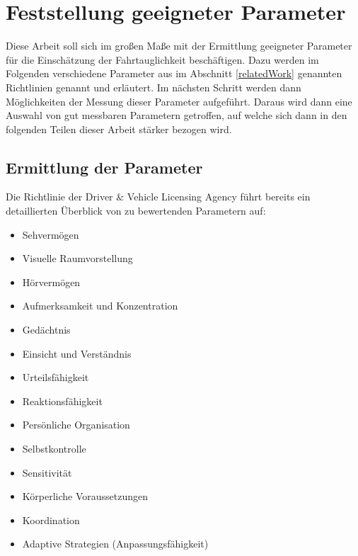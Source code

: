 \section{Feststellung geeigneter Parameter}
\label{parameters}

Diese Arbeit soll sich im großen Maße mit der Ermittlung geeigneter Parameter für die Einschätzung der Fahrtauglichkeit beschäftigen. Dazu werden im Folgenden verschiedene Parameter aus im Abschnitt \ref{relatedWork} genannten Richtlinien genannt und erläutert. Im nächsten Schritt werden dann Möglichkeiten der Messung dieser Parameter aufgeführt. Daraus wird dann eine Auswahl von gut messbaren Parametern getroffen, auf welche sich dann in den folgenden Teilen dieser Arbeit stärker bezogen wird.
\subsection{Ermittlung der Parameter}

Die Richtlinie der Driver \& Vehicle Licensing Agency \cite{drivervehiclelicencingagency} führt bereits ein detaillierten Überblick von zu bewertenden Parametern auf:

\begin{multicols}{2}
\begin{itemize}
	\item Sehvermögen
	\item Visuelle Raumvorstellung
	\item Hörvermögen
	\item Aufmerksamkeit und Konzentration
	\item Gedächtnis
	\item Einsicht und Verständnis
	\item Urteilsfähigkeit
	\item Reaktionsfähigkeit
	\item Persönliche Organisation
	\item Selbstkontrolle
	\item Sensitivität
	\item Körperliche Voraussetzungen
	\item Koordination
	\item Adaptive Strategien (Anpassungsfähigkeit)
\end{itemize}
\end{multicols}


